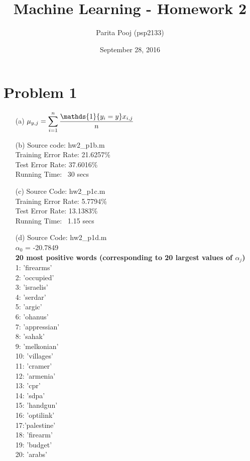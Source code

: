 \documentclass[fleqn]{article}
\title{Machine Learning - Homework 2}
\author{Parita Pooj (psp2133)}
\date{September 28, 2016}
\begin{document}
\maketitle
\setcounter{secnumdepth}{0}
\section{Problem 1}{}
\begin{itemize}
        \item[(a)]
                $\mu_{y, j} = \smashoperator{\sum_{i = 1}^{n}} \frac{\mathds{1}\{y_i = y\} x_{i, j}}{n}$
        \item[(b)]
                Source code: hw2\_p1b.m\\
                Training Error Rate: 21.6257\%\\
                Test Error Rate: 37.6016\%\\
                Running Time: ~30 secs
        \item[(c)]
                Source Code: hw2\_p1c.m\\
                Training Error Rate: 5.7794\%\\
                Test Error Rate: 13.1383\%\\
                Running Time: ~1.15 secs
        \item[(d)]
                Source Code: hw2\_p1d.m\\
                $\alpha_0$ = -20.7849\\
                \textbf{20 most positive words (corresponding to 20 largest values of $\alpha_j$)}\\
                1: 'firearms'\\
                2: 'occupied'\\
                3: 'israelis'\\
                4: 'serdar'\\
                5: 'argic'\\
                6: 'ohanus'\\
                7: 'appressian'\\
                8: 'sahak'\\
                9: 'melkonian'\\
                10: 'villages'\\
                11: 'cramer'\\
                12: 'armenia'\\
                13: 'cpr'\\
                14: 'sdpa'\\
                15: 'handgun'\\
                16: 'optilink'\\
                17:'palestine'\\
                18: 'firearm'\\
                19: 'budget'\\
                20: 'arabs'\\


\end{itemize}
\end{document}
